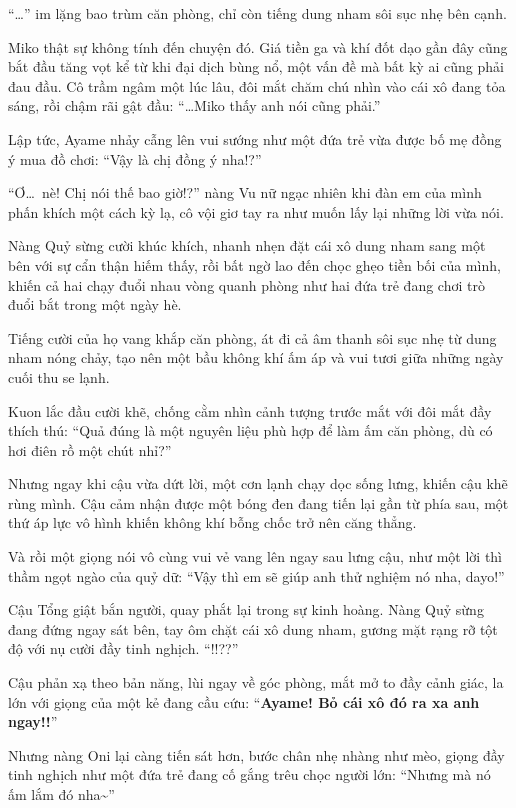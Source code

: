 \documentclass[../main.tex]{subfiles}
\begin{document}
``\dots'' im lặng bao trùm căn phòng, chỉ còn tiếng dung nham sôi sục nhẹ bên cạnh.

Miko thật sự không tính đến chuyện đó. Giá tiền ga và khí đốt dạo gần đây cũng bắt đầu tăng vọt kể từ khi đại dịch bùng nổ, một vấn đề mà bất kỳ ai cũng phải đau đầu. Cô trầm ngâm một lúc lâu, đôi mắt chăm chú nhìn vào cái xô đang tỏa sáng, rồi chậm rãi gật đầu: ``\dots Miko thấy anh nói cũng phải.''

Lập tức, Ayame nhảy cẫng lên vui sướng như một đứa trẻ vừa được bố mẹ đồng ý mua đồ chơi: ``Vậy là chị đồng ý nha!?''

``Ơ\dots\ nè! Chị nói thế bao giờ!?'' nàng Vu nữ ngạc nhiên khi đàn em của mình phấn khích một cách kỳ lạ, cô vội giơ tay ra như muốn lấy lại những lời vừa nói.

Nàng Quỷ sừng cười khúc khích, nhanh nhẹn đặt cái xô dung nham sang một bên với sự cẩn thận hiếm thấy, rồi bất ngờ lao đến chọc ghẹo tiền bối của mình, khiến cả hai chạy đuổi nhau vòng quanh phòng như hai đứa trẻ đang chơi trò đuổi bắt trong một ngày hè.

Tiếng cười của họ vang khắp căn phòng, át đi cả âm thanh sôi sục nhẹ từ dung nham nóng chảy, tạo nên một bầu không khí ấm áp và vui tươi giữa những ngày cuối thu se lạnh.

Kuon lắc đầu cười khẽ, chống cằm nhìn cảnh tượng trước mắt với đôi mắt đầy thích thú: ``Quả đúng là một nguyên liệu phù hợp để làm ấm căn phòng, dù có hơi điên rồ một chút nhỉ?''

Nhưng ngay khi cậu vừa dứt lời, một cơn lạnh chạy dọc sống lưng, khiến cậu khẽ rùng mình. Cậu cảm nhận được một bóng đen đang tiến lại gần từ phía sau, một thứ áp lực vô hình khiến không khí bỗng chốc trở nên căng thẳng.

Và rồi một giọng nói vô cùng vui vẻ vang lên ngay sau lưng cậu, như một lời thì thầm ngọt ngào của quỷ dữ: ``Vậy thì em sẽ giúp anh thử nghiệm nó nha, dayo!''

Cậu Tổng giật bắn người, quay phắt lại trong sự kinh hoàng. Nàng Quỷ sừng đang đứng ngay sát bên, tay ôm chặt cái xô dung nham, gương mặt rạng rỡ tột độ với nụ cười đầy tinh nghịch. ``!!??''

Cậu phản xạ theo bản năng, lùi ngay về góc phòng, mắt mở to đầy cảnh giác, la lớn với giọng của một kẻ đang cầu cứu: ``\textbf{Ayame! Bỏ cái xô đó ra xa anh ngay!!}''

Nhưng nàng Oni lại càng tiến sát hơn, bước chân nhẹ nhàng như mèo, giọng đầy tinh nghịch như một đứa trẻ đang cố gắng trêu chọc người lớn: ``Nhưng mà nó ấm lắm đó nha\~{}''
\end{document}
